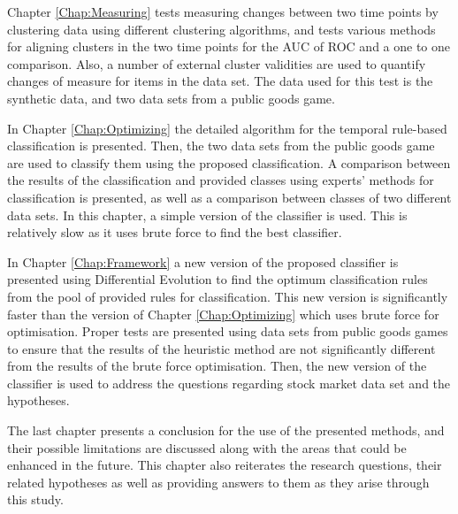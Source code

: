 Chapter \ref{Chap:Measuring} tests measuring changes between two time points by clustering data using different clustering algorithms, and tests various methods for aligning clusters in the two time points for the AUC of ROC and a one to one comparison. Also, a number of external cluster validities are used to quantify changes of measure for items in the data set. The data used for this test is the synthetic data, and two data sets from a public goods game.

In Chapter \ref{Chap:Optimizing} the detailed algorithm for the temporal rule-based classification is presented. Then, the two data sets from the public goods game are used to classify them using the proposed classification. A comparison between the results of the classification and provided classes using experts' methods for classification is presented, as well as a comparison between classes of two different data sets. In this chapter, a simple version of the classifier is used. This is relatively slow as it uses brute force to find the best classifier.

In Chapter \ref{Chap:Framework} a new version of the proposed classifier is presented using Differential Evolution to find the optimum classification rules from the pool of provided rules for classification. This new version is significantly faster than the version of Chapter \ref{Chap:Optimizing} which uses brute force for optimisation. Proper tests are presented using data sets from public goods games to ensure that the results of the heuristic method are not significantly different from the results of the brute force optimisation. Then, the new version of the classifier is used to address the questions regarding stock market data set and the hypotheses.

The last chapter presents a conclusion for the use of the presented methods, and their possible limitations are discussed along with the areas that could be enhanced in the future. This chapter also reiterates the research questions, their related hypotheses as well as providing answers to them as they arise through this study.

